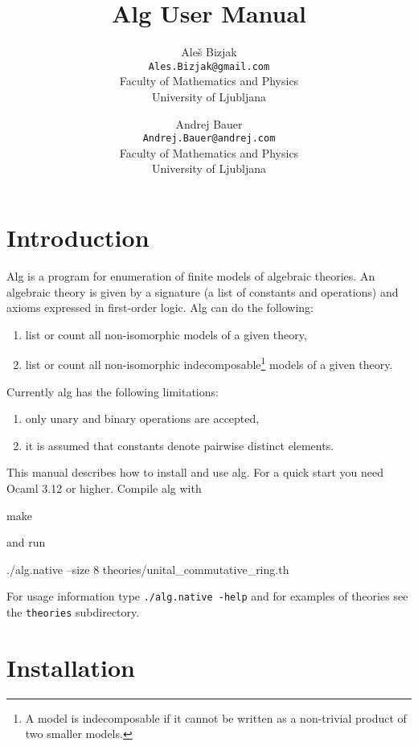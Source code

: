 \documentclass{article}
\begin{document}
\title{Alg User Manual}
\author{Ale\v{s} Bizjak\\
\texttt{Ales.Bizjak@gmail.com}\\
Faculty of Mathematics and Physics\\
University of Ljubljana
\and
Andrej Bauer\\
\texttt{Andrej.Bauer@andrej.com}\\
Faculty of Mathematics and Physics\\
University of Ljubljana}
\maketitle

\section{Introduction}
\label{sec:introduction}

Alg is a program for enumeration of finite models of algebraic
theories. An algebraic theory is given by a signature (a list of
constants and operations) and axioms expressed in first-order logic.
Alg can do the following:
%
\begin{enumerate}
\item list or count all non-isomorphic models of a given theory,
\item list or count all non-isomorphic indecomposable\footnote{A model
  is indecomposable if it cannot be written as a non-trivial product
  of two smaller models.} models of a given theory.
\end{enumerate}
%
Currently alg has the following limitations:
%
\begin{enumerate}
\item only unary and binary operations are accepted,
\item it is assumed that constants denote pairwise distinct elements.
\end{enumerate}
%
This manual describes how to install and use alg. For a quick start
you need Ocaml 3.12 or higher. Compile alg with
%
\begin{shell}
make
\end{shell}
%
and run
%
\begin{shell}
./alg.native --size 8 theories/unital_commutative_ring.th
\end{shell}
%
For usage information type \texttt{./alg.native -help} and for
examples of theories see the \texttt{theories} subdirectory.

\section{Installation}
\label{sec:installation}
\end{document}
